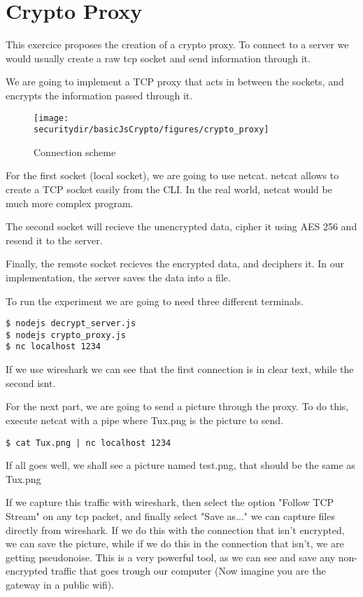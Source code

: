 \section{Crypto Proxy}
This exercice proposes the creation of a crypto proxy. To connect to a server we would usually create a raw tcp socket and send information through it. 

We are going to implement a TCP proxy that acts in between the sockets, and encrypts the information passed through it.

\begin{figure}[htb]
	\begin{centering}
		\texttt{[image: \\securitydir/basicJsCrypto/figures/crypto\_proxy]}
		\par\end{centering}
	\caption{\label{fig:crypto_proxy} Connection scheme}
\end{figure}


For the first socket (local socket), we are going to use netcat. netcat allows to create a TCP socket easily from the CLI. In the real world, netcat would be much more complex program.

The second socket will recieve the unencrypted data, cipher it using AES 256 and resend it to the server.

Finally, the remote socket recieves the encrypted data, and deciphers it. In our implementation, the server saves the data into a file.

To run the experiment we are going to need three different terminals.

\begin{lstlisting}
$ nodejs decrypt_server.js
$ nodejs crypto_proxy.js
$ nc localhost 1234
\end{lstlisting}


If we use wireshark we can see that the first connection is in clear text, while the second isnt.

For the next part, we are going to send a picture through the proxy. To do this, execute netcat with a pipe where Tux.png is the picture to send.

\begin{lstlisting}
$ cat Tux.png | nc localhost 1234
\end{lstlisting}

If all goes well, we shall see a picture named test.png, that should be the same as Tux.png

If we capture this traffic with wireshark, then select the option "Follow TCP Stream" on any tcp packet, and finally select "Save as..." we can capture files directly from wireshark. If we do this with the connection that isn't encrypted, we can save the picture, while if we do this in the connection that isn't, we are getting pseudonoise. This is a very powerful tool, as we can see and save any non-encrypted traffic that goes trough our computer (Now imagine you are the gateway in a public wifi).

